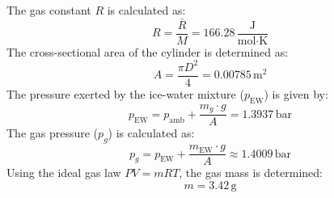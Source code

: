 The gas constant \( R \) is calculated as:  
\[
R = \frac{\bar{R}}{M} = 166.28 \, \frac{\text{J}}{\text{mol·K}}
\]  
The cross-sectional area of the cylinder is determined as:  
\[
A = \frac{\pi D^2}{4} = 0.00785 \, \text{m}^2
\]  
The pressure exerted by the ice-water mixture (\( p_{\text{EW}} \)) is given by:  
\[
p_{\text{EW}} = p_{\text{amb}} + \frac{m_g \cdot g}{A} = 1.3937 \, \text{bar}
\]  
The gas pressure (\( p_g \)) is calculated as:  
\[
p_g = p_{\text{EW}} + \frac{m_{\text{EW}} \cdot g}{A} \approx 1.4009 \, \text{bar}
\]  
Using the ideal gas law \( PV = mRT \), the gas mass is determined:  
\[
m = 3.42 \, \text{g}
\]